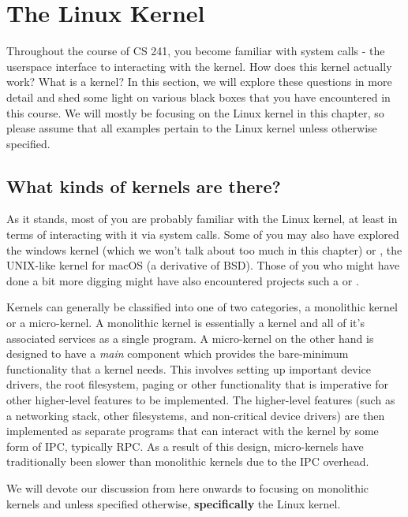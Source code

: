 \section{The Linux Kernel}

Throughout the course of CS 241, you become familiar with system calls - the userspace interface to interacting with the
kernel. How does this kernel actually work? What is a kernel? In this section, we will explore these questions in more
detail and shed some light on various black boxes that you have encountered in this course. We will mostly be focusing
on the Linux kernel in this chapter, so please assume that all examples pertain to the Linux kernel unless otherwise
specified.


\subsection{What kinds of kernels are there?}

As it stands, most of you are probably familiar with the Linux kernel, at least in terms of interacting with it via
system calls. Some of you may also have explored the windows kernel (which we won't talk about too much in this chapter)
or , the UNIX-like kernel for macOS (a derivative of BSD). Those of you who might have done a bit more
digging might have also encountered projects such a  or .

Kernels can generally be classified into one of two categories, a monolithic kernel or a micro-kernel. A monolithic
kernel is essentially a kernel and all of it's associated services as a single program. A micro-kernel on the other hand
is designed to have a \textit{main} component which provides the bare-minimum functionality that a kernel needs. This
involves setting up important device drivers, the root filesystem, paging or other functionality that is imperative for
other higher-level features to be implemented. The higher-level features (such as a networking stack, other filesystems,
and non-critical device drivers) are then implemented as separate programs that can interact with the kernel by some
form of IPC, typically RPC. As a result of this design, micro-kernels have traditionally been slower than monolithic
kernels due to the IPC overhead.

We will devote our discussion from here onwards to focusing on monolithic kernels and unless specified otherwise,
\textbf{specifically} the Linux kernel.

